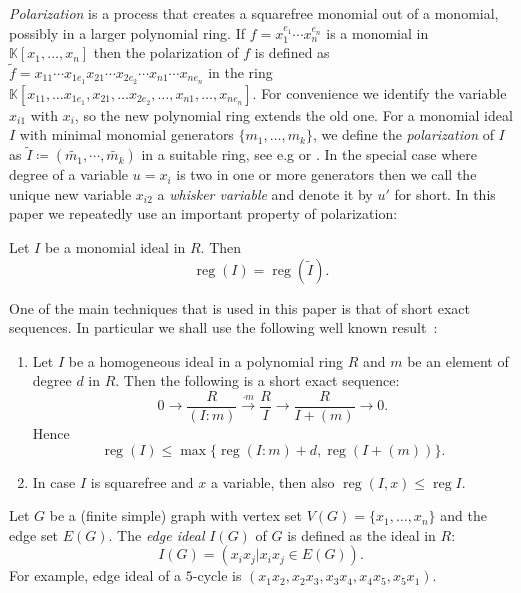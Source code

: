 \documentclass[ALCO,published]{cedram}
\numberwithin{equation}{section}
\newcommand \reg{\operatorname{reg}}
\newcommand \K{\mathbb{K}}
\begin{document}
    \emph{Polarization} is a process that creates a squarefree monomial out of a monomial, possibly in a larger polynomial ring. If $f=x_1^{e_1}\cdots x_n^{e_n}$ is a monomial in $\mathbb{K}[x_1, \ldots , x_n]$ then the polarization of $f$ is defined as $\tilde{f}=x_{11}\cdots x_{1e_1} x_{21} \cdots x_{2e_2}\cdots x_{n1} \cdots x_{n e_n}$ in the ring $\mathbb{K}[x_{11},\ldots x_{1e_1}, x_{21},\ldots x_{2e_2}, \ldots,  x_{n1}, \ldots, x_{ne_n}]$.
    For convenience
    we identify the variable $x_{i1}$ with $x_i$, so the new polynomial ring extends the old one.
    For a monomial ideal $I$ with minimal monomial generators $\{m_1,\ldots, m_k\}$, we define the \emph{polarization} of $I$ as $\widetilde{I}\coloneqq(\widetilde{m_1}, \cdots, \widetilde{m_k})$ in a suitable ring, see e.g
   \cite{Herzog'sBook} or \cite[Sec. 1.6]{kummini_thesis}. In the special case where degree of a variable $u=x_i$ is two in one or more generators then we call the unique new variable $x_{i2}$ a \emph{whisker variable} and denote it by $u'$ for short.
  In this paper we repeatedly use an important property of 
polarization:
\begin{theorem} Let $I$ be a monomial
ideal in $R$.
Then
$$\reg(I)=\reg(\widetilde{I}).$$
\label{thm:2.1}
\end{theorem}

One of the main techniques that is used in this paper is that of short exact sequences. 
In particular we shall use the following well known result~\cite[Lemma. 2.11]{banerjee}:

\begin{theorem}
\begin{enumerate}[label=(\roman*)]
\item Let $I$ be a homogeneous ideal in a polynomial ring $R$ and $m$ be an element of degree $d$ in $R$. Then the following is a short exact sequence: $$0 \longrightarrow \frac{R}{(I:m)} \overset{\cdot m} \longrightarrow \frac{R}{I} \longrightarrow \frac{R}{I+(m)} \longrightarrow 0.$$
Hence $$\reg(I) \leq \max \{\reg (I:m) +d, \reg (I+(m))\}.$$
\item In case $I$ is squarefree and $x$ a variable, then also $\reg(I,x) \leq \reg I$.
\end{enumerate}
\label{thm:2.2}
\end{theorem}


 Let $G$ be a (finite simple) graph with vertex set $V(G)=\{x_1, \ldots ,x_n\}$ and the edge set $E(G)$. The  \textit{edge ideal} $I(G)$ of $G$ is defined as the ideal in $R$: $$I(G)=(x_i x_j|x_ix_j \in E(G)).$$
 For example, edge ideal of a $5$-cycle is $(x_1x_2,x_2x_3,x_3x_4,x_4x_5,x_5x_1)$.
 
\end{document}
